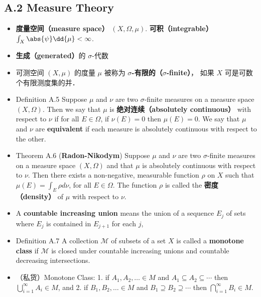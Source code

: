 
\begin{issues}
\issueDraft
\end{issues}

\subsection{A.2 Measure Theory}

\begin{itemize}
\item \textbf{度量空间（measure space）} $(X,\Omega,\mu)$. \textbf{可积（integrable）} $\int_X \abs{\psi} \dd{\mu} < \infty$.

\item \textbf{生成（generated）}的 $\sigma$-代数

\item 可测空间 $(X, \mu)$ 的度量 $\mu$ 被称为 \textbf{$\sigma$-有限的（$\sigma$-finite）}， 如果 $X$ 可是可数个有限测度集的并．

\item Definition A.5 Suppose $\mu$ and $\nu$ are two $\sigma$-finite measures on a measure space $(X, \Omega)$. Then we say that $\mu$ is \textbf{绝对连续（absolutely continuous）} with respect to $\nu$ if for all $E \in \Omega$, if $\nu(E)=0$ then $\mu(E)=0$. We say that $\mu$ and $\nu$ are \textbf{equivalent} if each measure is absolutely continuous with respect to the other.

\item Theorem A.6 (\textbf{Radon-Nikodym}) Suppose $\mu$ and $\nu$ are two $\sigma$-finite measures on a measure space $(X, \Omega)$ and that $\mu$ is absolutely continuous with respect to $\nu$. Then there exists a non-negative, measurable function $\rho$ on $X$ such that $\mu(E)=\int_{E} \rho d \nu$, for all $E \in \Omega$. The function $\rho$ is called the \textbf{密度（density）} of $\mu$ with respect to $\nu$.

\item A \textbf{countable increasing union} means the union of a sequence $E_j$ of sets
where $E_j$ is contained in $E_{j+1}$ for each $j$,

\item Definition A.7 A collection $\mathcal{M}$ of subsets of a set $X$ is called a \textbf{monotone class} if $\mathcal{M}$ is closed under countable increasing unions and countable decreasing intersections.

\item （私货）Monotone Class: 1. if $A_{1}, A_{2}, \ldots \in M$ and $A_{1} \subseteq A_{2} \subseteq \cdots$ then $\bigcup_{i=1}^{\infty} A_{i} \in M$, and 2. if $B_{1}, B_{2}, \ldots \in M$ and $B_{1} \supseteq B_{2} \supseteq \cdots$ then $\bigcap_{i=1}^{\infty} B_{i} \in M$.


\end{itemize}
